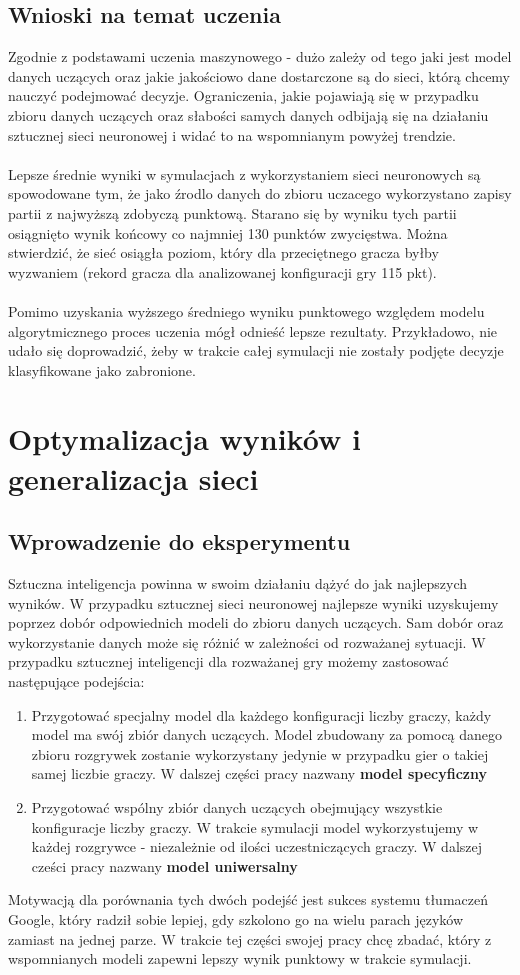 \documentclass[12pt, oneside]{report}
\begin{document}
\section{Wnioski na temat uczenia}
Zgodnie z podstawami uczenia maszynowego - dużo zależy od tego jaki jest model danych uczących oraz jakie jakościowo dane dostarczone są do sieci, którą chcemy nauczyć podejmować decyzje. Ograniczenia, jakie pojawiają się w przypadku zbioru danych uczących oraz słabości samych danych odbijają się na działaniu sztucznej sieci neuronowej i widać to na wspomnianym powyżej trendzie. \\ \\ 
Lepsze średnie wyniki w symulacjach z wykorzystaniem sieci neuronowych są spowodowane tym, że jako źrodlo danych do zbioru uczacego wykorzystano zapisy partii z najwyższą zdobyczą punktową. Starano się by wyniku tych partii osiągnięto wynik końcowy co najmniej 130 punktów zwycięstwa. Można stwierdzić, że sieć osiągła poziom, który dla przeciętnego gracza byłby wyzwaniem (rekord gracza dla analizowanej konfiguracji gry 115 pkt).
 \\ \\
Pomimo uzyskania wyższego średniego wyniku punktowego względem modelu algorytmicznego proces uczenia mógł odnieść lepsze rezultaty. Przykładowo, nie udało się doprowadzić, żeby w trakcie całej symulacji nie zostały podjęte decyzje klasyfikowane jako zabronione. 
\chapter{Optymalizacja wyników i generalizacja sieci}
\section{Wprowadzenie do eksperymentu}
\label{ch:compare_data}
Sztuczna inteligencja powinna w swoim działaniu dążyć do jak najlepszych wyników. W przypadku sztucznej sieci neuronowej najlepsze wyniki uzyskujemy poprzez dobór odpowiednich modeli do zbioru danych uczących. Sam dobór oraz wykorzystanie danych może się różnić w zależności od rozważanej sytuacji. W przypadku sztucznej inteligencji dla rozważanej gry możemy zastosować następujące podejścia:

\begin{enumerate}
	\item Przygotować specjalny model dla każdego konfiguracji liczby graczy, każdy model ma swój zbiór danych uczących. Model zbudowany za pomocą danego zbioru rozgrywek zostanie wykorzystany jedynie w przypadku gier o takiej samej liczbie graczy. W dalszej części pracy nazwany \textbf{model specyficzny}
	\item Przygotować wspólny zbiór danych uczących obejmujący wszystkie konfiguracje liczby graczy. W trakcie symulacji model wykorzystujemy w każdej rozgrywce - niezależnie od ilości uczestniczących graczy. W dalszej cześci pracy nazwany \textbf{model uniwersalny}
\end{enumerate}
Motywacją dla porównania tych dwóch podejść jest sukces systemu tłumaczeń Google, który radził sobie lepiej, gdy szkolono go na wielu parach języków zamiast na jednej parze. W trakcie tej części swojej pracy chcę zbadać, który z wspomnianych modeli zapewni lepszy wynik punktowy w trakcie symulacji.
\end{document}
